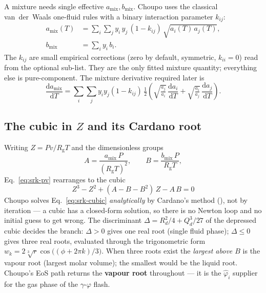 \documentclass[11pt,a4paper]{article}
\newcommand{\Rgas}{R_{\!\mathrm{g}}}                %
\begin{document}
A mixture needs single effective $a_{\mathrm{mix}}, b_{\mathrm{mix}}$.
Choupo uses the classical van~der~Waals one-fluid rules with a
binary interaction parameter $k_{ij}$:
\begin{align}
   a_{\mathrm{mix}}(T)
     &= \sum_i \sum_j y_i\,y_j\,(1 - k_{ij})\,\sqrt{a_i(T)\,a_j(T)},
        \label{eq:srk-amix}\\
   b_{\mathrm{mix}}
     &= \sum_i y_i\,b_i .
        \label{eq:srk-bmix}
\end{align}
The $k_{ij}$ are small empirical corrections (zero by default,
symmetric, $k_{ii}=0$) read from the optional
 sub-list.  They are the only fitted mixture
quantity; everything else is pure-component.  The mixture derivative
required later is
\begin{equation}
   \frac{\mathrm{d}a_{\mathrm{mix}}}{\mathrm{d}T}
   = \sum_i\sum_j y_i y_j (1-k_{ij})\,
     \tfrac12\!\left(\sqrt{\tfrac{a_j}{a_i}}\,\frac{\mathrm{d}a_i}{\mathrm dT}
        + \sqrt{\tfrac{a_i}{a_j}}\,\frac{\mathrm{d}a_j}{\mathrm dT}\right).
   \label{eq:srk-damixdT}
\end{equation}

\subsection{The cubic in \texorpdfstring{$Z$}{Z} and its Cardano root}

Writing $Z = Pv/\Rgas T$ and the dimensionless groups
\begin{equation}
   A = \frac{a_{\mathrm{mix}}\,P}{(\Rgas T)^2},
   \qquad
   B = \frac{b_{\mathrm{mix}}\,P}{\Rgas T},
   \label{eq:srk-AB}
\end{equation}
Eq.~\eqref{eq:srk-pv} rearranges to the cubic
\begin{equation}
   \boxed{\;Z^3 - Z^2 + (A - B - B^2)\,Z - A\,B = 0\;}
   \label{eq:srk-cubic}
\end{equation}
Choupo solves Eq.~\eqref{eq:srk-cubic} \emph{analytically} by
Cardano's method (), not by iteration ---
a cubic has a closed-form solution, so there is no Newton loop and no
initial guess to get wrong.  The discriminant
$\Delta = R_d^2/4 + Q_d^3/27$ of the depressed cubic decides the
branch: $\Delta > 0$ gives one real root (single fluid phase);
$\Delta \le 0$ gives three real roots, evaluated through the
trigonometric form $w_k = 2\sqrt[3]{r}\cos\!\bigl((\phi +
2\pi k)/3\bigr)$.  When three roots exist the \emph{largest above
$B$} is the vapour root (largest molar volume); the smallest would be
the liquid root.  Choupo's EoS path returns the \textbf{vapour
root} throughout --- it is the $\hat\varphi_i$ supplier for the
gas phase of the $\gamma$-$\varphi$ flash.
\end{document}
